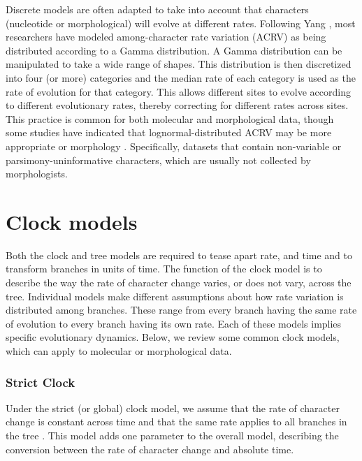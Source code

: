 \documentclass[11pt]{article}
\newcommand{\rw}[1]{{\textcolor{red}{[RW: #1]}}} %
\newcommand{\aw}[1]{{\textcolor{armygreen}{[AW: #1]}}} %
\begin{document}
Discrete models are often adapted to take into account that characters (nucleotide or morphological) will evolve at different rates. Following Yang \cite{Yang1994a}, 
most researchers have modeled among-character rate variation (ACRV) as being distributed according to a Gamma distribution.
A Gamma distribution can be manipulated to take a wide range of shapes.
This distribution is then discretized into four (or more) categories and the median rate of each category is used as the rate of evolution for that category.
This allows different sites to evolve according to different evolutionary rates, thereby correcting for different rates across sites.
This practice is common for both molecular and morphological data, though some studies have indicated that lognormal-distributed ACRV may be more appropriate or morphology \cite{wagner2011, Harrison2015}. Specifically, datasets that contain non-variable or parsimony-uninformative  characters, which are usually not collected by morphologists. %


\section{Clock models}
Both the clock and tree models are required to tease apart rate, and time and to transform branches in units of time.
The function of the clock model is to describe the way the rate of character change varies, or does not vary, across the tree.
Individual models make different assumptions about how rate variation is distributed among branches.
These range from  every branch having the same rate of evolution to every branch having its own rate.
Each of these models implies specific evolutionary dynamics.
Below, we review some common clock models, which can apply to molecular or morphological data.

\subsubsection{Strict Clock}
Under the strict (or global) clock model, we assume that the rate of character change is constant across time and that the same rate applies to all branches in the tree \cite{Zuckerkandl1962, Zuckerkandl1965EvolutionaryDivergenceConvergence}.
This model adds one parameter to the overall model, describing the conversion between the rate of character change  and absolute time.
\end{document}
